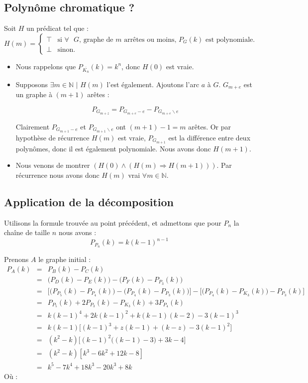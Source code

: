 \subsection{Polynôme chromatique ?}
Soit $H$ un prédicat tel que :
\begin{displaymath}
	H(m) = \left\{ \begin{array}{ll}
	\top & \textrm{si $\forall$ $G$, graphe de $m$ arrêtes ou moins, $P_G(k)$ est polynomiale.} \\
	\bot & \textrm{sinon.}
	\end{array} \right.
\end{displaymath} 
\begin{itemize} 
\item Nous rappelons que $P_{\overline{K_n}}(k)=k^n$, donc $H(0)$ est vraie. 
\item Supposons $\exists m \in \mathbb{N}$ $|$ $H(m)$ l'est également. Ajoutons l'arc $a$ à $G$. $G_{m+e}$ est un graphe à $(m+1)$ arêtes :

\[ P_{G_{m+z}} = P_{G_{m+e}-e} - P_{G_{m+e} \backslash e} \]

Clairement $P_{G_{m+1}-e}$ et $P_{G_{m+1} \backslash e}$ ont $(m+1)-1 = m$ arêtes. Or par hypothèse de récurrence $H(m)$ est vraie,
$P_{G_{m+1}}$ est la différence entre deux polynômes, donc il est également polynomiale. Nous avons donc $H(m+1)$.
\item Nous venons de montrer $(H(0) \wedge (H(m) \Rightarrow H(m+1)))$. Par récurrence nous avons donc $H(m)$ vrai $\forall m \in \mathbb{N}$. 

\end{itemize} 

\subsection{Application de la décomposition}
Utilisons la formule trouvée au point précédent, et admettons que pour $P_n$ la chaîne de taille $n$ nous avons :
\[ P_{P_n}(k) = k(k-1)^{n-1} \]

Prenons $A$ le graphe initial :
\begin{eqnarray*}
P_A(k) & = & P_B(k) - P_C(k) \\
&=& \big(P_D(k)-P_E(k)\big)-\big(P_F(k)-P_{P_3}(k)\big)\\
&=& \Big[\big(P_{P_5}(k)-P_{P_4}(k)\big)-\big(P_{P_4}(k)-P_{P_3}(k)\big)\Big]-\Big[\big(P_{P_4}(k)-P_{K_3}(k)\big)-P_{P_3}(k)\Big]\\
&=& P_{P_5}(k)+2P_{P_3}(k)-P_{K_3}(k)+3P_{P_4}(k)\\
&=& k(k-1)^4 +2k(k-1)^2+k(k-1)(k-2)-3(k-1)^3 \\
&=& k(k-1)\big[(k-1)^3+z(k-1)+(k-z)-3(k-1)^2\big]\\
&=& (k^2-k)\Big[(k-1)^2\big((k-1)-3\big)+3k -4 \Big]\\
&=& (k^2-k)[k^3-6k^2+12k-8]\\
&=& k^5-7k^4+18k^3-20k^3+8k
\end{eqnarray*}
Où :

